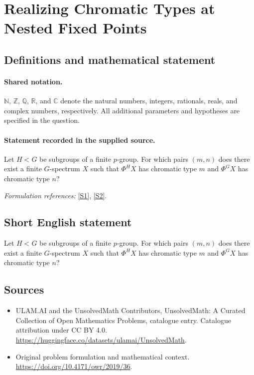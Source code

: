 \documentclass[11pt]{article}
\newcommand{\sref}[2]{\hyperlink{source:#1:#2}{[S#2]}}
\begin{document}
\section{Realizing Chromatic Types at Nested Fixed Points}\label{statement}

\subsection{Definitions and mathematical statement}

\paragraph{Shared notation.}$\mathbb N$, $\mathbb Z$, $\mathbb Q$, $\mathbb R$, and $\mathbb C$ denote the natural numbers, integers, rationals, reals, and complex numbers, respectively. All additional parameters and hypotheses are specified in the question.


\paragraph{Statement recorded in the supplied source.}
Let $H<G$ be subgroups of a finite $p$-group. For which pairs $(m,n)$ does there exist a finite $G$-spectrum $X$ such that $\Phi^H X$ has chromatic type $m$ and $\Phi^G X$ has chromatic type $n$?
\par\smallskip\textit{Formulation references:} \sref{statement}{1}, \sref{statement}{2}.
\subsection{Short English statement}
Let $H<G$ be subgroups of a finite $p$-group. For which pairs $(m,n)$ does there exist a finite $G$-spectrum $X$ such that $\Phi^H X$ has chromatic type $m$ and $\Phi^G X$ has chromatic type $n$?
\subsection{Sources}
\begin{itemize}
\item[\hypertarget{source:statement:1}{S1}] ULAM.AI and the UnsolvedMath Contributors, UnsolvedMath: A Curated Collection of Open Mathematics Problems, catalogue entry. Catalogue attribution under CC BY 4.0.
\url{https://huggingface.co/datasets/ulamai/UnsolvedMath}.
\item[\hypertarget{source:statement:2}{S2}] Original problem formulation and mathematical context.
\url{https://doi.org/10.4171/owr/2019/36}.
\end{itemize}
\label{end:statement}
\end{document}
